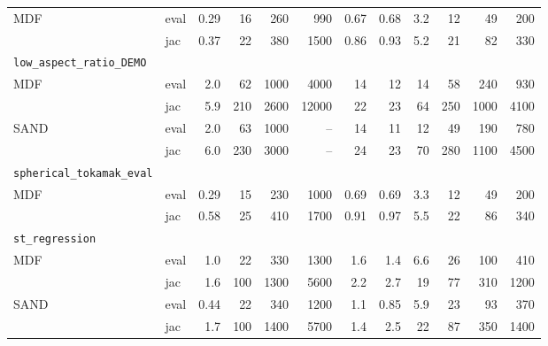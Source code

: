 \begin{tabular}{llrrrrrrrrrr}
MDF & eval & 0.29 & 16 & 260 & 990 & 0.67 & 0.68 & 3.2 & 12 & 49 & 200 \\
 & jac & 0.37 & 22 & 380 & 1500 & 0.86 & 0.93 & 5.2 & 21 & 82 & 330 \\
\midrule
\rule{0pt}{2.4ex}\texttt{low\_aspect\_ratio\_DEMO} & & & & & & & & & & & \\
MDF & eval & 2.0 & 62 & 1000 & 4000 & 14 & 12 & 14 & 58 & 240 & 930 \\
 & jac & 5.9 & 210 & 2600 & 12000 & 22 & 23 & 64 & 250 & 1000 & 4100 \\
SAND & eval & 2.0 & 63 & 1000 & -- & 14 & 11 & 12 & 49 & 190 & 780 \\
 & jac & 6.0 & 230 & 3000 & -- & 24 & 23 & 70 & 280 & 1100 & 4500 \\
\midrule
\rule{0pt}{2.4ex}\texttt{spherical\_tokamak\_eval} & & & & & & & & & & & \\
MDF & eval & 0.29 & 15 & 230 & 1000 & 0.69 & 0.69 & 3.3 & 12 & 49 & 200 \\
 & jac & 0.58 & 25 & 410 & 1700 & 0.91 & 0.97 & 5.5 & 22 & 86 & 340 \\
\midrule
\rule{0pt}{2.4ex}\texttt{st\_regression} & & & & & & & & & & & \\
MDF & eval & 1.0 & 22 & 330 & 1300 & 1.6 & 1.4 & 6.6 & 26 & 100 & 410 \\
 & jac & 1.6 & 100 & 1300 & 5600 & 2.2 & 2.7 & 19 & 77 & 310 & 1200 \\
SAND & eval & 0.44 & 22 & 340 & 1200 & 1.1 & 0.85 & 5.9 & 23 & 93 & 370 \\
 & jac & 1.7 & 100 & 1400 & 5700 & 1.4 & 2.5 & 22 & 87 & 350 & 1400 \\
\bottomrule
\end{tabular}
